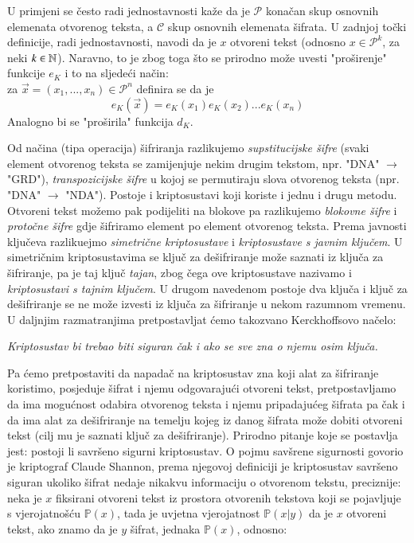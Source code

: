 \documentclass[a4paper,oneside,12pt]{memoir} %
\begin{document}
\begin{spacing}{1.5}
\begin{defn}
\begin{itemize}
\end{itemize}
\end{defn}
\begin{rem}
U primjeni se često radi jednostavnosti kaže da je $\mathcal{P}$ konačan skup osnovnih elemenata otvorenog teksta, a $\mathcal{C}$ skup osnovnih elemenata šifrata. U zadnjoj točki definicije, radi jednostavnosti, navodi da je $x$ otvoreni tekst (odnosno $x \in \mathcal{P}^k$, za neki $k \in \mathbb{N}$). Naravno, to je zbog toga što se prirodno može uvesti "proširenje" funkcije $e_K$ i to na sljedeći način: \\ 
za $\vec{x}=(x_1,...,x_n) \in \mathcal{P}^n$ definira se da je \[e_K(\vec{x})=e_K(x_1)e_K(x_2)...e_K(x_n)\]
Analogno bi se "proširila" funkcija $d_K$. 
\end{rem}
Od načina (tipa operacija) šifriranja razlikujemo \textit{supstitucijske šifre} (svaki element otvorenog teksta se zamijenjuje nekim drugim tekstom, npr. "DNA" $\to$ "GRD"), \textit{transpozicijske šifre} u kojoj se permutiraju slova otvorenog teksta (npr. "DNA" $\to$ "NDA"). Postoje i kriptosustavi koji koriste i jednu i drugu metodu. Otvoreni tekst možemo pak podijeliti na blokove pa razlikujemo \textit{blokovne šifre} i  \textit{protočne šifre}	gdje šifriramo element po element otvorenog teksta. Prema javnosti ključeva razlikuejmo \textit{simetrične kriptosustave} i \textit{kriptosustave s javnim ključem}. U simetričnim kriptosustavima se ključ za dešifriranje može saznati iz ključa za šifriranje, pa je taj ključ \textit{tajan}, zbog čega ove kriptosustave nazivamo i \textit{kriptosustavi s tajnim ključem}. U drugom navedenom postoje dva ključa i ključ za dešifriranje se ne može izvesti iz ključa za šifriranje u nekom razumnom vremenu. U daljnjim razmatranjima pretpostavljat ćemo takozvano Kerckhoffsovo načelo:
\begin{center}
	\textit{Kriptosustav bi trebao biti siguran čak i ako se sve zna o njemu osim ključa.}
\end{center}
Pa ćemo pretpostaviti da napadač na kriptosustav zna koji alat za šifriranje koristimo, posjeduje šifrat i njemu odgovarajući otvoreni tekst, pretpostavljamo da ima mogućnost odabira otvorenog teksta i njemu pripadajućeg šifrata pa čak i da ima alat za dešifriranje na temelju kojeg iz danog šifrata može dobiti otvoreni tekst (cilj mu je saznati ključ za dešifriranje). Prirodno pitanje koje se postavlja jest: postoji li savršeno sigurni kriptosustav. O pojmu savšrene sigurnosti govorio je kriptograf Claude Shannon, prema njegovoj definiciji je kriptosustav savršeno siguran ukoliko šifrat nedaje nikakvu informaciju o otvorenom tekstu, preciznije: neka je $x$ fiksirani otvoreni tekst iz prostora otvorenih tekstova koji se pojavljuje s vjerojatnošću $\mathbb{P}(x)$, tada je uvjetna vjerojatnost $\mathbb{P}(x|y)$ da je $x$ otvoreni tekst, ako znamo da je $y$ šifrat, jednaka $\mathbb{P}(x)$, odnosno:

\end{spacing}
\end{document}
